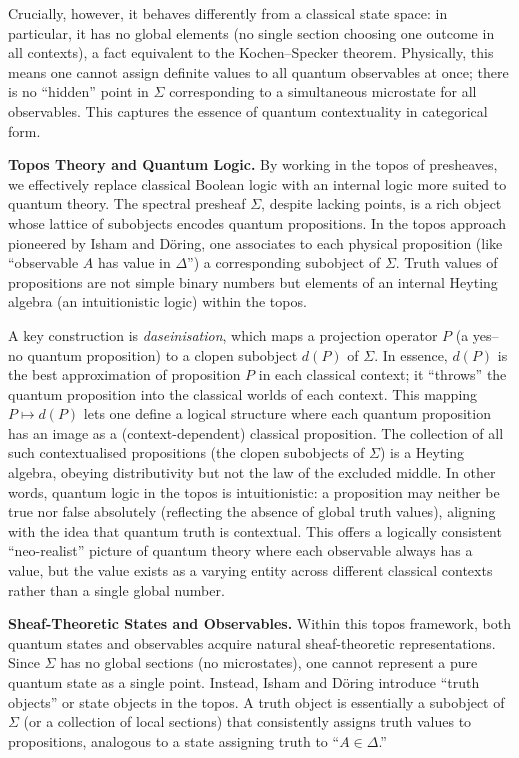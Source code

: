 \documentclass[12pt]{article}
\begin{document}
Crucially, however, it behaves differently from a classical state space: in particular, it has no global elements (no single section choosing one outcome in all contexts), a fact equivalent to the Kochen--Specker theorem. Physically, this means one cannot assign definite values to all quantum observables at once; there is no ``hidden'' point in $\Sigma$ corresponding to a simultaneous microstate for all observables. This captures the essence of quantum contextuality in categorical form.

\medskip
\textbf{Topos Theory and Quantum Logic.} By working in the topos of presheaves, we effectively replace classical Boolean logic with an internal logic more suited to quantum theory. The spectral presheaf $\Sigma$, despite lacking points, is a rich object whose lattice of subobjects encodes quantum propositions. In the topos approach pioneered by Isham and Döring, one associates to each physical proposition (like ``observable $A$ has value in $\Delta$'') a corresponding subobject of $\Sigma$. Truth values of propositions are not simple binary numbers but elements of an internal Heyting algebra (an intuitionistic logic) within the topos.

A key construction is \emph{daseinisation}, which maps a projection operator $P$ (a yes--no quantum proposition) to a clopen subobject $d(P)$ of $\Sigma$. In essence, $d(P)$ is the best approximation of proposition $P$ in each classical context; it ``throws'' the quantum proposition into the classical worlds of each context. This mapping $P \mapsto d(P)$ lets one define a logical structure where each quantum proposition has an image as a (context-dependent) classical proposition. The collection of all such contextualised propositions (the clopen subobjects of $\Sigma$) is a Heyting algebra, obeying distributivity but not the law of the excluded middle. In other words, quantum logic in the topos is intuitionistic: a proposition may neither be true nor false absolutely (reflecting the absence of global truth values), aligning with the idea that quantum truth is contextual. This offers a logically consistent ``neo-realist'' picture of quantum theory where each observable always has a value, but the value exists as a varying entity across different classical contexts rather than a single global number.

\medskip
\textbf{Sheaf-Theoretic States and Observables.} Within this topos framework, both quantum states and observables acquire natural sheaf-theoretic representations. Since $\Sigma$ has no global sections (no microstates), one cannot represent a pure quantum state as a single point. Instead, Isham and Döring introduce ``truth objects'' or state objects in the topos. A truth object is essentially a subobject of $\Sigma$ (or a collection of local sections) that consistently assigns truth values to propositions, analogous to a state assigning truth to ``$A\in \Delta$.''
\end{document}
